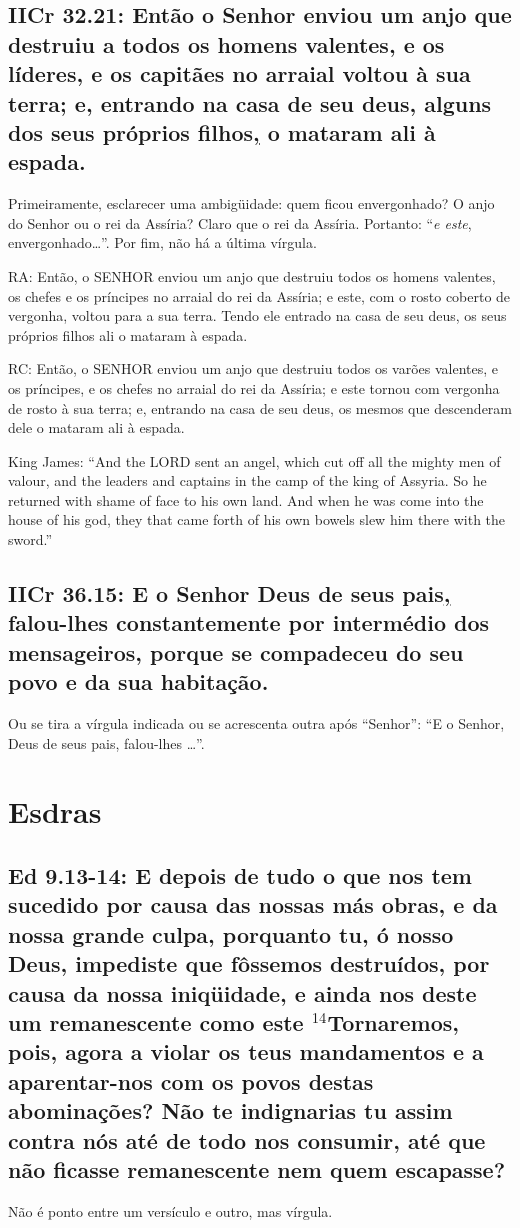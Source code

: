 \subsection{IICr 32.21: Então o Senhor enviou um anjo que destruiu a todos os homens valentes, e os líderes, e os capitães no arraial  voltou à sua terra; e, entrando na casa de seu deus, alguns dos seus próprios filhos\uline{,} o mataram ali à espada.}

Primeiramente, esclarecer uma ambigüidade: quem ficou envergonhado? O
anjo do Senhor ou o rei da Assíria? Claro que o rei da Assíria.
Portanto: ``\emph{e este}, envergonhado\ldots''. Por fim, não há a
última vírgula.

RA: Então, o SENHOR enviou um anjo que destruiu todos os homens valentes, os chefes e os príncipes no arraial do rei da Assíria; e este, com o rosto coberto de vergonha, voltou para a sua terra. Tendo ele entrado na casa de seu deus, os seus próprios filhos ali o mataram à espada.

RC: Então, o SENHOR enviou um anjo que destruiu todos os varões valentes, e os príncipes, e os chefes no arraial do rei da Assíria; e este tornou com vergonha de rosto à sua terra; e, entrando na casa de seu deus, os mesmos que descenderam dele o mataram ali à espada.

King James: ``And the LORD sent an angel, which cut off all the mighty men         of valour, and the leaders and captains in the camp of the king of Assyria. So he returned with shame of face to his own land. And when he was come into the house of his god, they that came forth of his own bowels slew him there with the sword.''

\subsection{IICr 36.15: E o Senhor Deus de seus pais\uline{,} falou-lhes constantemente por intermédio dos mensageiros, porque se compadeceu do seu povo e da sua habitação.}
Ou se tira a vírgula indicada ou se acrescenta outra após ``Senhor'': ``E o Senhor, Deus de seus pais, falou-lhes \ldots''.

\section{Esdras}
\subsection{Ed 9.13-14: E depois de tudo o que nos tem sucedido por causa das nossas más obras, e da nossa grande culpa, porquanto tu, ó nosso Deus, impediste que fôssemos destruídos, por causa da nossa iniqüidade, e ainda nos deste um remanescente como este $^{\mathrm{14}}$Tornaremos, pois, agora a violar os teus mandamentos e a aparentar-nos com os povos destas abominações? Não te indignarias tu assim contra nós até de todo nos consumir, até que não ficasse remanescente nem quem escapasse?}
Não é ponto entre um versículo e outro, mas vírgula.

